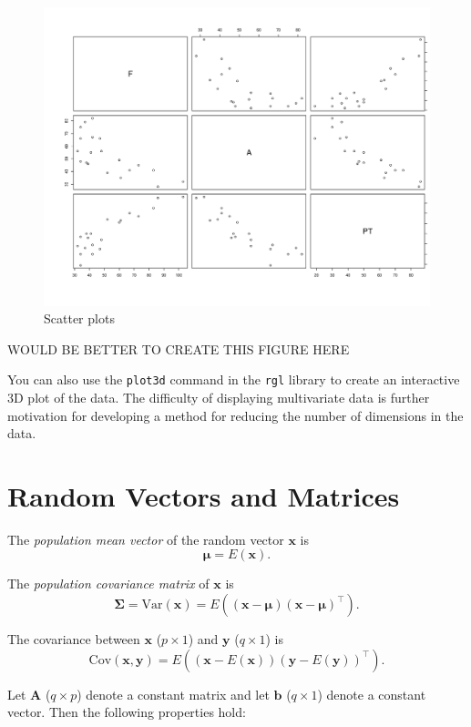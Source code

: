 \documentclass[]{book}
\theoremstyle{definition}
\theoremstyle{definition}
\theoremstyle{definition}
\theoremstyle{remark}
\begin{document}
\begin{figure}
\centering
\includegraphics{figs/pairs.png}
\caption{Scatter plots}
\end{figure}

WOULD BE BETTER TO CREATE THIS FIGURE HERE

You can also use the \texttt{plot3d} command in the \texttt{rgl} library to create an interactive 3D plot of the data. The difficulty of displaying multivariate data is further motivation for developing a method for reducing the number of dimensions in the data.

\hypertarget{random-vectors-and-matrices}{%
\section{Random Vectors and Matrices}\label{random-vectors-and-matrices}}

The \emph{population mean vector} of the random vector \(\boldsymbol x\) is
\[\boldsymbol \mu= E(\boldsymbol x).\]

The \emph{population covariance matrix} of \(\boldsymbol x\) is
\[ \boldsymbol \Sigma= \text{Var}(\boldsymbol x) = E \left((\boldsymbol x-\boldsymbol \mu)(\boldsymbol x-\boldsymbol \mu)^\top \right).\]

The covariance between \(\boldsymbol x\) (\(p \times 1\)) and \(\boldsymbol y\) (\(q \times 1\)) is
\[ \text{Cov}(\boldsymbol x,\boldsymbol y) = E \left((\boldsymbol x- E(\boldsymbol x))(\boldsymbol y- E(\boldsymbol y))^\top \right). \]

Let \(\boldsymbol A\) (\(q \times p\)) denote a constant matrix and let \(\boldsymbol b\) (\(q \times 1\)) denote a constant vector. Then the following properties hold:
\end{document}
